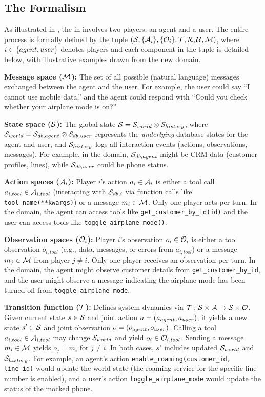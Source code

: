 \subsection{The \decpomdp Formalism}
\label{sec:decpomdp_framework}

As illustrated in , the \decpomdp in \bench involves two players: an agent and a user. The entire process is formally defined by the tuple $({\mathcal{S}}, \{{\mathcal{A}}_i\}, \{{\mathcal{O}}_i\}, {\mathcal{T}}, {\mathcal{R}}, {\mathcal{U}}, {\mathcal{M}})$, where $i \in \{agent, user\}$ denotes players and each component in the tuple is detailed below, with illustrative examples drawn from the new \telecom domain.

\textbf{Message space (${\mathcal{M}}$):} The set of all possible (natural language) messages exchanged between the agent and the user. For example, the user could say ``I cannot use mobile data.'' and the agent could respond with ``Could you check whether your airplane mode is on?''

\textbf{State space (${\mathcal{S}}$):} The global state ${\mathcal{S}} = {\mathcal{S}}_{world} \otimes {\mathcal{S}}_{history}$, where ${\mathcal{S}}_{world} = {\mathcal{S}}_{db,agent} \otimes {\mathcal{S}}_{db,user}$ represents the \textit{underlying} database states for the agent and user, and ${\mathcal{S}}_{history}$ logs all interaction events (actions, observations, messages). For example, in the \telecom domain, ${\mathcal{S}}_{db,agent}$ might be CRM data (customer profiles, lines), while ${\mathcal{S}}_{db,user}$ could be phone status.

\textbf{Action spaces (${\mathcal{A}}_i$):} Player $i$'s action $a_i \in {\mathcal{A}}_i$ is either a tool call $a_{i,tool} \in {\mathcal{A}}_{i,tool}$ (interacting with ${\mathcal{S}}_{db,i}$ via function calls like \texttt{tool\_name(**kwargs)}) or a message $m_i \in {\mathcal{M}}$. Only one player acts per turn. In the \telecom domain, the agent can access tools like \texttt{get\_customer\_by\_id(id)} and the user can access tools like \texttt{toggle\_airplane\_mode()}.

\textbf{Observation spaces (${\mathcal{O}}_i$):} Player $i$'s observation $o_i \in {\mathcal{O}}_i$ is either a tool observation $o_{i,tool}$ (e.g., data, messages, or errors from $a_{i,tool}$) or a message $m_j \in {\mathcal{M}}$ from player $j \neq i$. Only one player receives an observation per turn. In the \telecom domain, the agent might observe customer details from \texttt{get\_customer\_by\_id}, and the user might observe a message indicating the airplane mode has been turned off from \texttt{toggle\_airplane\_mode}.

\textbf{Transition function (${\mathcal{T}}$):} Defines system dynamics via ${\mathcal{T}}: {\mathcal{S}} \times {\mathcal{A}} \to {\mathcal{S}} \times {\mathcal{O}}$. Given current state $s \in {\mathcal{S}}$ and joint action $a=(a_{agent}, a_{user})$, it yields a new state $s' \in {\mathcal{S}}$ and joint observation $o = (o_{agent}, o_{user})$. Calling a tool $a_{i,tool} \in {\mathcal{A}}_{i,tool}$ may change ${\mathcal{S}}_{world}$ and yield $o_i \in {\mathcal{O}}_{i,tool}$. Sending a message $m_i \in {\mathcal{M}}$ yields $o_j=m_i$ for $j \neq i$. In both cases, $s'$ includes updated ${\mathcal{S}}_{world}$ and ${\mathcal{S}}_{history}$. For example, an agent's action \texttt{enable\_roaming(customer\_id, line\_id)} would update the world state (the roaming service for the specific line number is enabled), and a user's action \texttt{toggle\_airplane\_mode} would update the status of the mocked phone.

